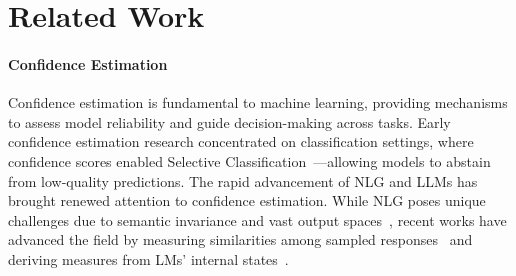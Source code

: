 \section{Related Work}\label{sec:related}




\paragraph{Confidence Estimation}
Confidence estimation is fundamental to machine learning, providing mechanisms to assess model reliability and guide decision-making across tasks.
Early confidence estimation research concentrated on classification settings, where confidence scores enabled Selective Classification~\cite{geifman2017selective,el2010foundations,feng2022towards}—allowing models to abstain from low-quality predictions. 
The rapid advancement of NLG and LLMs has brought renewed attention to confidence estimation. 
While NLG poses unique challenges due to semantic invariance and vast output spaces~\cite{kuhn2023semantic}, recent works have advanced the field by measuring similarities among sampled responses~\cite{lin2024generating} and deriving measures from LMs' internal states~\cite{malininuncertainty,CSL,azaria-mitchell-2023-internal}.


